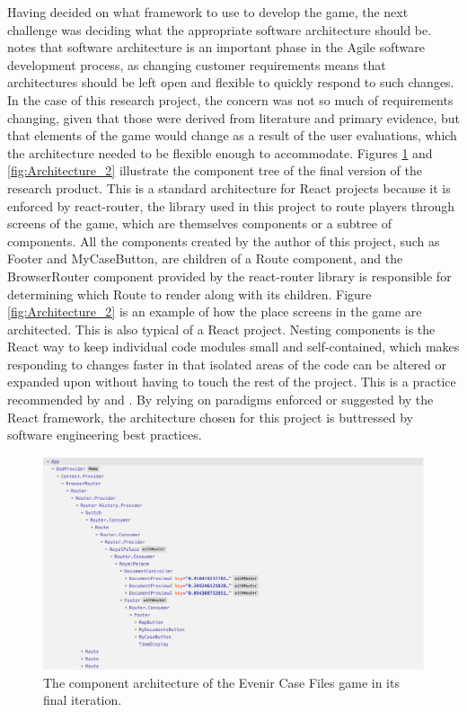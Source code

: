 \documentclass{l4proj}
\begin{document}
Having decided on what framework to use to develop the game, the next challenge was deciding what the appropriate software architecture should be. \citet{dawson2000twenty} notes that software architecture is an important phase in the Agile software development process, as changing customer requirements means that architectures should be left open and flexible to quickly respond to such changes. In the case of this research project, the concern was not so much of requirements changing, given that those were derived from literature and primary evidence, but that elements of the game would change as a result of the user evaluations, which the architecture needed to be flexible enough to accommodate. Figures \ref{fig:Architecture_1} and \ref{fig:Architecture_2} illustrate the component tree of the final version of the research product. This is a standard architecture for React projects because it is enforced by react-router, the library used in this project to route players through screens of the game, which are themselves components or a subtree of components. All the components created by the author of this project, such as Footer and MyCaseButton, are children of a Route component, and the BrowserRouter component provided by the react-router library is responsible for determining which Route to render along with its children. Figure \ref{fig:Architecture_2} is an example of how the place screens in the game are architected. This is also typical of a React project. Nesting components is the React way to keep individual code modules small and self-contained, which makes responding to changes faster in that isolated areas of the code can be altered or expanded upon without having to touch the rest of the project. This is a practice recommended by \citet{dawson2000twenty} and \citet{schwaber2002agile}. By relying on paradigms enforced or suggested by the React framework, the architecture chosen for this project is buttressed by software engineering best practices.

\hfill \break

\begin{figure}[!htb]
    \centering
    \includegraphics[scale=0.4]{images/Architecture_1.png}
    \caption{The component architecture of the Evenir Case Files game in its final iteration.}
    \label{fig:Architecture_1}
\end{figure}
\end{document}
